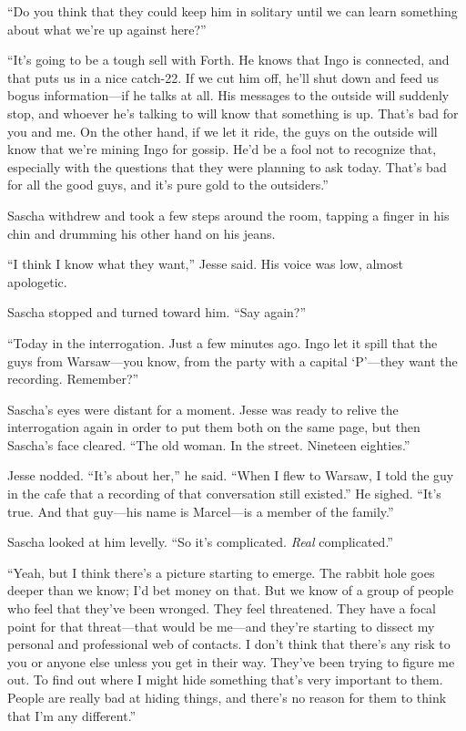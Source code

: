 \documentclass[12pt]{book}
\begin{document}
``Do you think that they could keep him in solitary until we can learn something about what we're up against here?''

``It's going to be a tough sell with Forth.  He knows that Ingo is connected, and that puts us in a nice catch-22.  If we cut him off, he'll shut down and feed us bogus information---if he talks at all.  His messages to the outside will suddenly stop, and whoever he's talking to will know that something is up.  That's bad for you and me.  On the other hand, if we let it ride, the guys on the outside will know that we're mining Ingo for gossip.  He'd be a fool not to recognize that, especially with the questions that they were planning to ask today.  That's bad for all the good guys, and it's pure gold to the outsiders.''

Sascha withdrew and took a few steps around the room, tapping a finger in his chin and drumming his other hand on his jeans.

``I think I know what they want,'' Jesse said.  His voice was low, almost apologetic.

Sascha stopped and turned toward him.  ``Say again?''

``Today in the interrogation.  Just a few minutes ago.  Ingo let it spill that the guys from Warsaw---you know, from the party with a capital `P'---they want the recording.  Remember?''

Sascha's eyes were distant for a moment.  Jesse was ready to relive the interrogation again in order to put them both on the same page, but then Sascha's face cleared.  ``The old woman.  In the street.  Nineteen eighties.''

Jesse nodded.  ``It's about her,'' he said.  ``When I flew to Warsaw, I told the guy in the cafe that a recording of that conversation still existed.''  He sighed.  ``It's true.  And that guy---his name is Marcel---is a member of the family.''

Sascha looked at him levelly.  ``So it's complicated.  \emph{Real} complicated.''

``Yeah, but I think there's a picture starting to emerge.  The rabbit hole goes deeper than we know; I'd bet money on that.  But we know of a group of people who feel that they've been wronged.  They feel threatened.  They have a focal point for that threat---that would be me---and they're starting to dissect my personal and professional web of contacts.  I don't think that there's any risk to you or anyone else unless you get in their way.  They've been trying to figure me out.  To find out where I might hide something that's very important to them.  People are really bad at hiding things, and there's no reason for them to think that I'm any different.''
\end{document}
